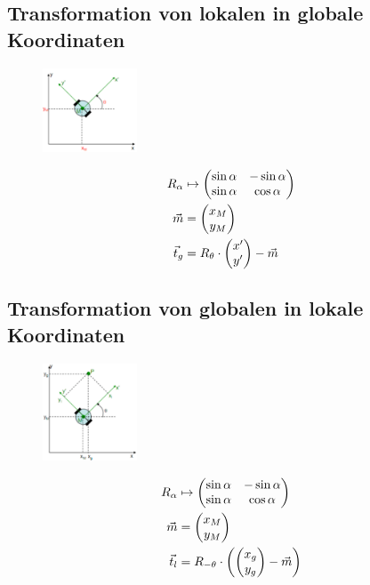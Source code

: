 \subsection*{Transformation von lokalen in globale Koordinaten}
\vspace{-0.6cm}
{
\begin{figure}
	\centering
	\includegraphics[width=0.25\textwidth]
		{Resources/PNG/transformationLocalGlobalBsp.png}
\end{figure}
\begin{align*}
	R_\alpha	&\mapsto\begin{pmatrix}\sin\alpha&-\sin\alpha\\\sin\alpha & \cos\alpha\end{pmatrix} \\
	\vec{m} 	&= \begin{pmatrix}x_M\\y_M\end{pmatrix} 																						 \\
	\vec{t}_g	&= R_\theta \cdot \begin{pmatrix}x'\\y'\end{pmatrix} - \vec{m}
\end{align*}

}

\subsection*{Transformation von globalen in lokale Koordinaten}
\vspace{-0.6cm}
{
\begin{figure}
	\centering
	\includegraphics[width=0.25\textwidth]
		{Resources/PNG/transformationGlobalToLocal.png}
\end{figure}
\begin{align*}
	R_\alpha	&\mapsto\begin{pmatrix}\sin\alpha&-\sin\alpha\\\sin\alpha & \cos\alpha\end{pmatrix} \\
	\vec{m} 	&= \begin{pmatrix}x_M\\y_M\end{pmatrix} 																						 \\
	\vec{t}_l	&= R_{-\theta} \cdot \left(\begin{pmatrix}x_g\\y_g\end{pmatrix} - \vec{m}\right)
\end{align*}

}

